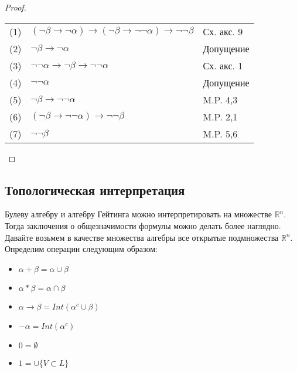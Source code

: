 \begin{proof}
\begin{enumerate}
\begin{itemize}
\begin{tabular}{lll}
(1) &$(\neg \beta \rightarrow \neg \alpha) \rightarrow (\neg \beta \rightarrow \neg \neg \alpha) \rightarrow \neg \neg \beta$& Сх. акс. 9\\
(2) &$\neg \beta \rightarrow \neg \alpha$& Допущение\\
(3) &$\neg \neg \alpha \rightarrow \neg \beta \rightarrow \neg \neg \alpha$& Сх. акс. 1\\
(4) &$\neg \neg \alpha$& Допущение\\
(5) &$\neg \beta \rightarrow \neg \neg \alpha$& M.P. 4,3\\
(6) &$(\neg \beta \rightarrow \neg \neg \alpha) \rightarrow \neg \neg \beta$& M.P. 2,1\\
(7) &$\neg \neg \beta$& M.P. 5,6\\
\end{tabular}
\end{itemize}
\end{enumerate}
\end{proof}
\subsection{Топологическая интерпретация}
\label{sec-5-9}
Булеву алгебру и алгебру Гейтинга можно интерпретировать на множестве $\mathbb R^n$. Тогда заключения о общезначимости формулы можно делать более наглядно. Давайте возьмем в качестве множества алгебры все открытые подмножества $\mathbb R^n$. Определим операции следующим образом:
\begin{itemize}
\item $\alpha + \beta = \alpha \cup \beta$
\item $\alpha * \beta = \alpha \cap \beta$
\item $\alpha \rightarrow \beta = Int(\alpha^c\cup\beta)$
\item $-\alpha = Int(\alpha^c)$
\item $0 = \emptyset$
\item $1 = \cup \lbrace V \subset L \rbrace$
\end{itemize}
